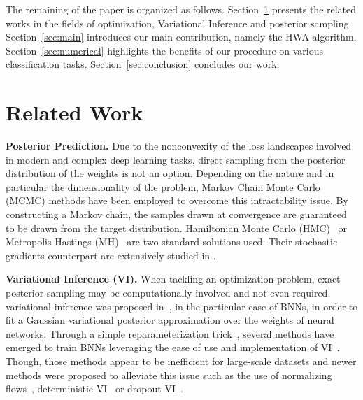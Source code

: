 \documentclass[tablecaption=bottom,wcp]{jmlr} %
\begin{document}
The remaining of the paper is organized as follows.
Section~\ref{sec:related} presents the related works in the fields of optimization, Variational Inference and posterior sampling.
Section~\ref{sec:main} introduces our main contribution, namely the HWA algorithm.
Section~\ref{sec:numerical} highlights the benefits of our procedure on various classification tasks.
Section~\ref{sec:conclusion} concludes our work.

 
\section{Related Work}\label{sec:related}

\textbf{Posterior Prediction.}
Due to the nonconvexity of the loss landscapes involved in modern and complex deep learning tasks, direct sampling from the posterior distribution of the weights is not an option.
Depending on the nature and in particular the dimensionality of the problem, Markov Chain Monte Carlo (MCMC) methods have been employed to overcome this intractability issue.
By constructing a Markov chain, the samples drawn at convergence are guaranteed to be drawn from the target distribution.
Hamiltonian Monte Carlo (HMC)~\citep{neal2011mcmc} or Metropolis Hastings (MH)~\citep{hastings1970monte} are two standard solutions used.
Their stochastic gradients counterpart are extensively studied in \citep{ma2015complete}.

\vspace{0.08in}
\noindent \textbf{Variational Inference (VI).}
When tackling an optimization problem, exact posterior sampling may be computationally involved and not even required.
variational inference was proposed in~\citep{graves2011practical}, in the particular case of BNNs, in order to fit a Gaussian variational posterior approximation over the weights of neural networks.
Through a simple reparameterization trick~\citep{blundell2015weight}, several methods have emerged to train BNNs leveraging the ease of use and implementation of VI~\citep{kingma2015variational,blundell2015weight,molchanov2017variational}.
Though, those methods appear to be inefficient for large-scale datasets and newer methods were proposed to alleviate this issue such as the use of normalizing flows~\citep{louizos2017multiplicative}, deterministic VI~\citep{wu2018deterministic} or dropout VI~\citep{gal2016dropout}.
\end{document}
